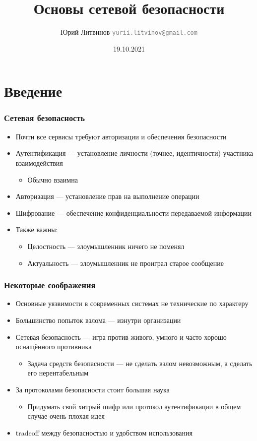 \documentclass[xetex,mathserif,serif]{beamer}
\title{Основы сетевой безопасности}
\author[Юрий Литвинов]{Юрий Литвинов \newline \textcolor{gray}{\small\texttt{yurii.litvinov@gmail.com}}}
\date{19.10.2021}
\begin{document}
    \frame{\titlepage}

    \section{Введение}

    \begin{frame}
        \frametitle{Сетевая безопасность}
        \begin{itemize}
            \item Почти все сервисы требуют авторизации и обеспечения безопасности
            \item Аутентификация --- установление личности (точнее, идентичности) участника взаимодействия
            \begin{itemize}
                \item Обычно взаимна
            \end{itemize}
            \item Авторизация --- установление прав на выполнение операции
            \item Шифрование --- обеспечение конфиденциальности передаваемой информации
            \item Также важны:
            \begin{itemize}
                \item Целостность --- злоумышленник ничего не поменял
                \item Актуальность --- злоумышленник не проиграл старое сообщение
            \end{itemize} 
        \end{itemize}
    \end{frame}

    \begin{frame}
        \frametitle{Некоторые соображения}
        \begin{itemize}
            \item Основные уязвимости в современных системах не технические по характеру
            \item Большинство попыток взлома --- изнутри организации
            \item Сетевая безопасность --- игра против живого, умного и часто хорошо оснащённого противника
            \begin{itemize}
                \item Задача средств безопасности --- не сделать взлом невозможным, а сделать его нерентабельным
            \end{itemize}
            \item За протоколами безопасности стоит большая наука
            \begin{itemize}
                \item Придумать свой хитрый шифр или протокол аутентификации в общем случае очень плохая идея
            \end{itemize} 
            \item tradeoff между безопасностью и удобством использования
        \end{itemize}
    \end{frame}
\end{document}
